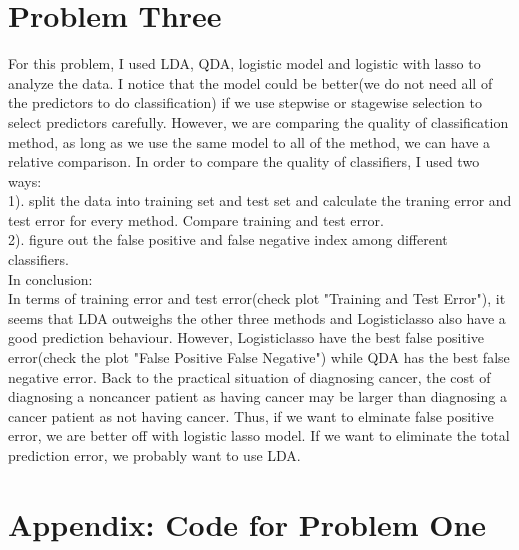 \documentclass{article}\usepackage[]{graphicx}\usepackage[]{color}
\begin{document}
\section*{Problem Three}
For this problem, I used LDA, QDA, logistic model and logistic with lasso to analyze the data. I notice that the model could be better(we do not need all of the predictors to do classification) if we use stepwise or stagewise selection to select predictors carefully. However, we are comparing the quality of classification method, as long as we use the same model to all of the method, we can have a relative comparison. In order to compare the quality of classifiers, I used two ways:\\
1). split the data into training set and test set and calculate the traning error and test error for every method. Compare training and test error.\\
2). figure out the false positive and false negative index among different classifiers.\\
In conclusion:\\
In terms of training error and test error(check plot "Training and Test Error"), it seems that LDA outweighs the other three methods and Logisticlasso also have a good prediction behaviour. However, Logisticlasso have the best false positive error(check the plot "False Positive False Negative") while QDA has the best false negative error. Back to the practical situation of diagnosing cancer, the cost of diagnosing a noncancer patient as having cancer may be larger than diagnosing a cancer patient as not having cancer. Thus, if we want to elminate false positive error, we are better off with logistic lasso model. If we want to eliminate the total prediction error, we probably want to use LDA.

\section*{Appendix: Code for Problem One}
\end{document}

